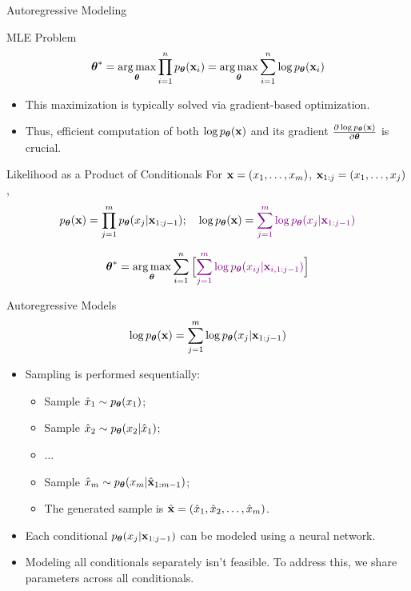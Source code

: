 \documentclass{beamer}
\renewcommand{\eqpause}{}
\begin{document}
\begin{frame}{Autoregressive Modeling}
    \begin{block}{MLE Problem}
	    \vspace{-0.4cm}
	    $$
	        \boldsymbol{\theta}^* = \operatorname*{arg\,max}_{\boldsymbol{\theta}} \prod_{i=1}^n p_{\boldsymbol{\theta}}(\mathbf{x}_i) = \operatorname*{arg\,max}_{\boldsymbol{\theta}} \sum_{i=1}^n \log p_{\boldsymbol{\theta}}(\mathbf{x}_i)
	    $$
	    \vspace{-0.5cm}
    \end{block}
    \eqpause
    \begin{itemize}
        \item This maximization is typically solved via gradient-based optimization.
        \item Thus, efficient computation of both $\log p_{\boldsymbol{\theta}}(\mathbf{x})$ and its gradient $\frac{\partial \log p_{\boldsymbol{\theta}}(\mathbf{x})}{\partial \boldsymbol{\theta}}$ is crucial.
    \end{itemize}
    \eqpause
    \begin{block}{Likelihood as a Product of Conditionals}
    For $\mathbf{x} = (x_1, \dots, x_m)$, $\mathbf{x}_{1:j} = (x_1, \dots, x_j)$,
    $$
        p_{\boldsymbol{\theta}}(\mathbf{x}) = \prod_{j=1}^m p_{\boldsymbol{\theta}}(x_j | \mathbf{x}_{1:j - 1});\quad
        \log p_{\boldsymbol{\theta}}(\mathbf{x}) = {\color{violet}\sum_{j=1}^m \log p_{\boldsymbol{\theta}}(x_j | \mathbf{x}_{1:j - 1})}
    $$
    \end{block}
    \eqpause
    \vspace{-0.5cm}
	 $$
	     \boldsymbol{\theta}^* =  \operatorname*{arg\,max}_{\boldsymbol{\theta}} \sum_{i=1}^n \Big[{\color{violet} \sum_{j=1}^m \log p_{\boldsymbol{\theta}}(x_{ij} | \mathbf{x}_{i, 1:j - 1})}\Big]
	 $$
\end{frame}
\begin{frame}{Autoregressive Models}
    \[
    	\log p_{\boldsymbol{\theta}}(\mathbf{x}) = \sum_{j=1}^m \log p_{\boldsymbol{\theta}}(x_j | \mathbf{x}_{1:j - 1})
    \]
    \eqpause
    \begin{itemize}
	    \item Sampling is performed sequentially:
	    \begin{itemize}
    		\item Sample $\hat{x}_1 \sim p_{\boldsymbol{\theta}}(x_1)$;
    		\item Sample $\hat{x}_2 \sim p_{\boldsymbol{\theta}}(x_2 | \hat{x}_1)$;
    		\item $\ldots$
    		\item Sample $\hat{x}_m \sim p_{\boldsymbol{\theta}}(x_m | \hat{\mathbf{x}}_{1:m-1})$;
    		\item The generated sample is $\hat{\mathbf{x}} = (\hat{x}_1, \hat{x}_2, \ldots, \hat{x}_m)$.
    	\end{itemize}
        \eqpause
        \item Each conditional $p_{\boldsymbol{\theta}}(x_j | \mathbf{x}_{1:j - 1})$ can be modeled using a neural network.
        \eqpause
        \item Modeling all conditionals separately isn't feasible. To address this, we share parameters across all conditionals.
    \end{itemize}
\end{frame}
\end{document}
